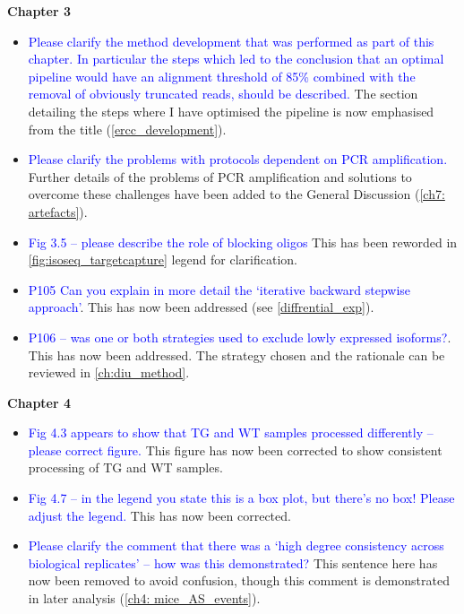 \documentclass[a4paper,12pt,oneside]{report}
\begin{document}
\vspace{1cm}
\textbf{Chapter 3} 
\begin{itemize}
	\item \textcolor{blue}{Please clarify the method development that was performed as part of this chapter. In particular the steps which led to the conclusion that an optimal pipeline would have an alignment threshold of 85\% combined with the removal of obviously truncated reads, should be described.}
	\newline The section detailing the steps where I have optimised the pipeline is now emphasised from the title (\cref{ercc_development}).
	\item \textcolor{blue}{Please clarify the problems with protocols dependent on PCR amplification.}
	\newline Further details of the problems of PCR amplification and solutions to overcome these challenges have been added to the General Discussion (\cref{ch7: artefacts}).
	\item \textcolor{blue}{Fig 3.5 – please describe the role of blocking oligos}
	\newline This has been reworded in \cref{fig:isoseq_targetcapture} legend for clarification.
	\item \textcolor{blue}{P105 Can you explain in more detail the ‘iterative backward stepwise approach’}.
	\newline This has now been addressed (see \cref{diffrential_exp}). 
	\item \textcolor{blue}{P106 – was one or both strategies used to exclude lowly expressed isoforms?}.
	\newline This has now been addressed. The strategy chosen and the rationale can be reviewed in \cref{ch:diu_method}.
\end{itemize}


\vspace{1cm}
\textbf{Chapter 4} 
\begin{itemize} 
	\item \textcolor{blue}{Fig 4.3 appears to show that TG and WT samples processed differently – please correct figure.}
	\newline This figure has now been corrected to show consistent processing of TG and WT samples.
	\item \textcolor{blue}{Fig 4.7 – in the legend you state this is a box plot, but there’s no box! Please adjust the legend.} 
	\newline This has now been corrected. 
	\item \textcolor{blue}{Please clarify the comment that there was a ‘high degree consistency across biological replicates’ – how was this demonstrated?}
	\newline This sentence here has now been removed to avoid confusion, though this comment is demonstrated in later analysis (\cref{ch4: mice_AS_events}).
\end{itemize}
\end{document}
